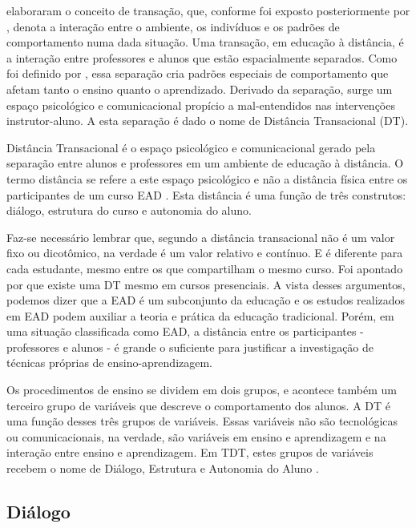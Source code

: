  elaboraram o conceito de transação, que, conforme
foi exposto posteriormente por , denota a
interação entre o ambiente, os indivíduos e os padrões de comportamento numa
dada situação. Uma transação, em educação à distância, é a interação entre
professores e alunos que estão espacialmente separados. Como foi definido por
, essa separação cria padrões especiais de
comportamento que afetam tanto o ensino quanto o aprendizado. Derivado da
separação, surge um espaço psicológico e comunicacional propício a
mal-entendidos nas intervenções instrutor-aluno. A esta separação é dado o nome
de Distância Transacional (DT).

Distância Transacional é o espaço psicológico e comunicacional gerado pela
separação entre alunos e professores em um ambiente de educação à distância. O
termo distância se refere a este espaço psicológico e não a distância física
entre os participantes de um curso EAD \cite{goel2012transactional}. Esta
distância é uma função de três construtos: diálogo, estrutura do curso e
autonomia do aluno.

Faz-se necessário lembrar que, segundo  a
distância transacional não é um valor fixo ou dicotômico, na verdade é um valor
relativo e contínuo. E é diferente para cada estudante, mesmo entre os que
compartilham o mesmo curso. Foi apontado por  que
existe uma DT mesmo em cursos presenciais. A vista desses argumentos, podemos
dizer que a EAD é um subconjunto da educação e os estudos realizados em EAD
podem auxiliar a teoria e prática da educação tradicional. Porém, em uma
situação classificada como EAD, a distância entre os participantes - professores
e alunos - é grande o suficiente para justificar a investigação de técnicas
próprias de ensino-aprendizagem.

Os procedimentos de ensino se dividem em dois grupos, e acontece também um
terceiro grupo de variáveis que descreve o comportamento dos alunos. A DT é uma
função desses três grupos de variáveis. Essas variáveis não são tecnológicas ou
comunicacionais, na verdade, são variáveis em ensino e aprendizagem e na
interação entre ensino e aprendizagem. Em TDT, estes grupos de variáveis recebem
o nome de Diálogo, Estrutura e Autonomia do Aluno \cite{moore2008teoria}.

\subsection{Diálogo}

